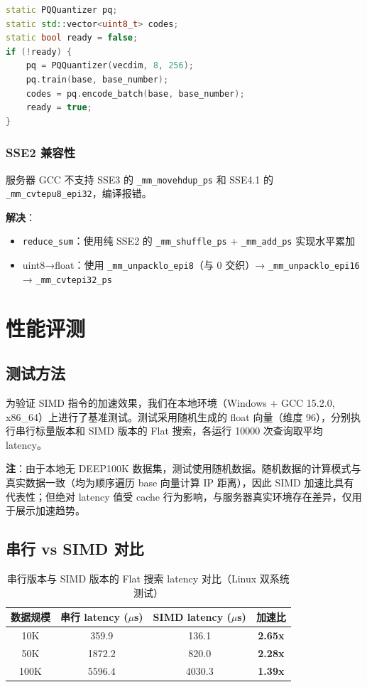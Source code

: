 \documentclass[a4paper]{article}
\begin{document}
\begin{lstlisting}[language=C++]
static PQQuantizer pq;
static std::vector<uint8_t> codes;
static bool ready = false;
if (!ready) {
    pq = PQQuantizer(vecdim, 8, 256);
    pq.train(base, base_number);
    codes = pq.encode_batch(base, base_number);
    ready = true;
}
\end{lstlisting}

\subsubsection{SSE2 兼容性}

服务器 GCC 不支持 SSE3 的 \texttt{\_mm\_movehdup\_ps} 和 SSE4.1 的 \texttt{\_mm\_cvtepu8\_epi32}，编译报错。

\textbf{解决}：
\begin{itemize}
  \item \texttt{reduce\_sum}：使用纯 SSE2 的 \texttt{\_mm\_shuffle\_ps} + \texttt{\_mm\_add\_ps} 实现水平累加
  \item uint8→float：使用 \texttt{\_mm\_unpacklo\_epi8}（与 0 交织）→ \texttt{\_mm\_unpacklo\_epi16} → \texttt{\_mm\_cvtepi32\_ps}
\end{itemize}

\section{性能评测}

\subsection{测试方法}

为验证 SIMD 指令的加速效果，我们在本地环境（Windows + GCC 15.2.0, x86_64）上进行了基准测试。测试采用随机生成的 float 向量（维度 96），分别执行串行标量版本和 SIMD 版本的 Flat 搜索，各运行 10000 次查询取平均 latency。

\textbf{注}：由于本地无 DEEP100K 数据集，测试使用随机数据。随机数据的计算模式与真实数据一致（均为顺序遍历 base 向量计算 IP 距离），因此 SIMD 加速比具有代表性；但绝对 latency 值受 cache 行为影响，与服务器真实环境存在差异，仅用于展示加速趋势。

\subsection{串行 vs SIMD 对比}

\begin{table}[!htbp]
  \centering
  \begin{tabular}{cccc}
  \toprule
  数据规模 & 串行 latency ($\mu$s) & SIMD latency ($\mu$s) & 加速比 \\
  \midrule
  10K & 359.9 & 136.1 & \textbf{2.65x} \\
  50K & 1872.2 & 820.0 & \textbf{2.28x} \\
  100K & 5596.4 & 4030.3 & \textbf{1.39x} \\
  \bottomrule
  \end{tabular}
  \caption{串行版本与 SIMD 版本的 Flat 搜索 latency 对比（Linux 双系统测试）}
\end{table}
\end{document}
